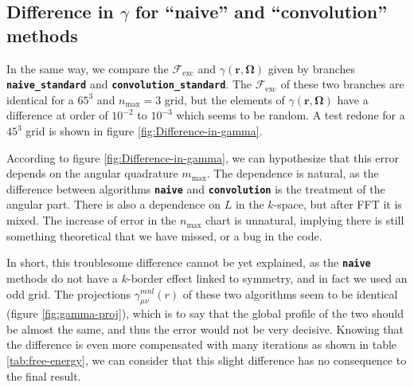 \subsection{Difference in $\gamma$ for ``naive'' and ``convolution'' methods}

In the same way, we compare the $\mathcal{F}_{\mathrm{exc}}$ and
$\gamma(\mathbf{r},\mathbf{\Omega})$ given by branches \texttt{\textbf{naive\_standard}}
and \texttt{\textbf{convolution\_standard}}. The $\mathcal{F}_{\mathrm{exc}}$
of these two branches are identical for a $65^{3}$ and $n_{\max}=3$
grid, but the elements of $\gamma(\mathbf{r},\mathbf{\Omega})$ have
a difference at order of $10^{-2}$ to $10^{-3}$ which seems to be
random. A test redone for a $45^{3}$ grid is shown in figure \ref{fig:Difference-in-gamma}.

According to figure \ref{fig:Difference-in-gamma}, we can hypothesize
that this error depends on the angular quadrature $m_{\max}$. The
dependence is natural, as the difference between algorithms \texttt{\textbf{naive}}
and \texttt{\textbf{convolution}} is the treatment of the angular
part. There is also a dependence on $L$ in the $k$-space, but after
\acs{FFT} it is mixed. The increase of error in the $n_{\max}$ chart
is unnatural, implying there is still something theoretical that we
have missed, or a bug in the code.

In short, this troublesome difference cannot be yet explained, as
the \texttt{\textbf{naive}} methods do not have a $k$-border effect
linked to symmetry, and in fact we used an odd grid. The projections
$\gamma_{\mu\nu}^{mnl}(r)$ of these two algorithms seem to be identical
(figure \ref{fig:gamma-proj}), which is to say that the global profile
of the two should be almost the same, and thus the error would not
be very decisive. Knowing that the difference is even more compensated
with many iterations as shown in table \ref{tab:free-energy}, we
can consider that this slight difference has no consequence to the
final result.

